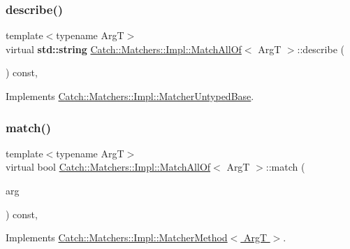 \subsubsection{\texorpdfstring{describe()}{describe()}}
{\footnotesize\ttfamily template$<$typename ArgT$>$ \\
virtual \textbf{ std\+::string} \hyperlink{struct_catch_1_1_matchers_1_1_impl_1_1_match_all_of}{Catch\+::\+Matchers\+::\+Impl\+::\+Match\+All\+Of}$<$ ArgT $>$\+::describe (\begin{DoxyParamCaption}{ }\end{DoxyParamCaption}) const\hspace{0.3cm}{\ttfamily [inline]}, {\ttfamily [virtual]}}



Implements \hyperlink{class_catch_1_1_matchers_1_1_impl_1_1_matcher_untyped_base_a91d3a907dbfcbb596077df24f6e11fe2}{Catch\+::\+Matchers\+::\+Impl\+::\+Matcher\+Untyped\+Base}.

\mbox{\label{struct_catch_1_1_matchers_1_1_impl_1_1_match_all_of_a7bf0c2d8cedf67ecf9d0a527cb5a8263}} 
\subsubsection{\texorpdfstring{match()}{match()}}
{\footnotesize\ttfamily template$<$typename ArgT$>$ \\
virtual bool \hyperlink{struct_catch_1_1_matchers_1_1_impl_1_1_match_all_of}{Catch\+::\+Matchers\+::\+Impl\+::\+Match\+All\+Of}$<$ ArgT $>$\+::match (\begin{DoxyParamCaption}\item[{ArgT const \&}]{arg }\end{DoxyParamCaption}) const\hspace{0.3cm}{\ttfamily [inline]}, {\ttfamily [virtual]}}



Implements \hyperlink{struct_catch_1_1_matchers_1_1_impl_1_1_matcher_method_ae0920ff9e817acf08e1bb0cbcb044e30}{Catch\+::\+Matchers\+::\+Impl\+::\+Matcher\+Method$<$ Arg\+T $>$}.

\mbox{\label{struct_catch_1_1_matchers_1_1_impl_1_1_match_all_of_a9d0e38b36474336498d627610db434f3}} 
